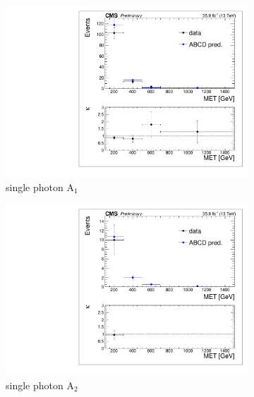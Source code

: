 \begin{figure}[hbp!]
\centering
\begin{subfigure}[b]{0.425\textwidth}
\includegraphics[trim={5px 5px 5px 5px},clip,width=\textwidth]{figs/dataClosure_single-tagSR_photon.pdf}
\caption{single photon A$_{1}$}
\end{subfigure}
\begin{subfigure}[b]{0.425\textwidth}
\includegraphics[trim={5px 5px 5px 5px},clip,width=\textwidth]{figs/dataClosure_double-tagSR_photon.pdf} 
\caption{single photon A$_{2}$}
\end{subfigure}
\vspace{5mm}
\\
\begin{subfigure}[b]{0.425\textwidth}

\end{subfigure}
\end{figure}
